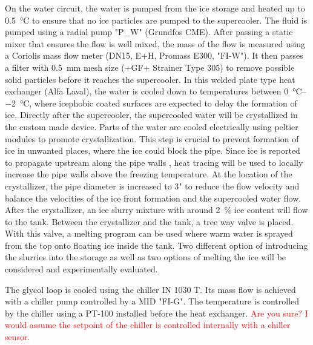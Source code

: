 \documentclass[english]{SFOEYearlyReportEnglish_2018}
\begin{document}
On the water circuit, the water is pumped from the ice storage and heated up to \SI{0.5}{\celsius} to ensure that no ice particles are pumped to the supercooler. The fluid is pumped using a radial pump "P\_W" (Grundfos CME). After passing a static mixer that ensures the flow is well mixed, the mass of the flow is measured using a Coriolis mass flow meter (DN15, E+H, Promass E300, "FI-W"). It then passes a filter with \SI{0.5}{mm} mesh size (+GF+ Strainer Type 305) to remove possible solid particles before it reaches the supercooler. In this welded plate type heat exchanger (Alfa Laval), the water is cooled down to temperatures between \SIrange{0}{-2}{\celsius}, where icephobic coated surfaces are expected to delay the formation of ice. Directly after the supercooler, the supercooled water will be crystallized in the custom made device. Parts of the water are cooled electrically using peltier modules to promote crystallization. This step is crucial to prevent formation of ice in unwanted places, where the ice could block the pipe. Since ice is reported to propagate upstream along the pipe walls  \citep{mito_new_2002}, heat tracing will be used to locally increase the pipe walls above the freezing temperature. At the location of the crystallizer, the pipe diameter is increased to \si{3}{"} to reduce the flow velocity and balance the velocities of the ice front formation and the supercooled water flow. After the crystallizer, an ice slurry mixture with around 2~\% ice content will flow to the tank. Between the crystallizer and the tank, a tree way valve is placed. With this valve, a melting program can be used where warm water is sprayed from the top onto floating ice inside the tank. Two different option of introducing the slurries into the storage as  well as two options of melting the ice will be considered and experimentally evaluated.


The glycol loop is cooled using the chiller IN 1030 T. Its mass flow is achieved with a chiller pump controlled by a MID "FI-G". The temperature is controlled by the chiller using   a PT-100 installed before the heat exchanger. \textcolor{red}{Are you sure? I would assume the setpoint of the chiller is controlled internally with a chiller sensor.}
\end{document}
